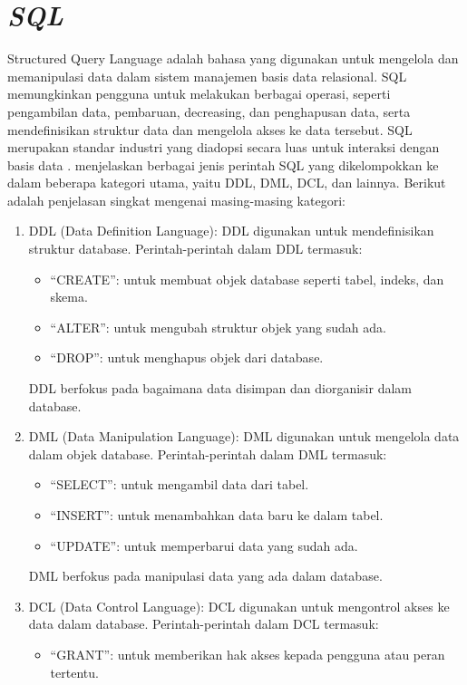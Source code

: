 \section{\textit{SQL}}
Structured Query Language adalah bahasa yang digunakan untuk mengelola dan memanipulasi data dalam sistem manajemen basis data relasional. SQL memungkinkan pengguna untuk melakukan berbagai operasi, seperti pengambilan data, pembaruan, decreasing, dan penghapusan data, serta mendefinisikan struktur data dan mengelola akses ke data tersebut. SQL merupakan standar industri yang diadopsi secara luas untuk interaksi dengan basis data \citep{santoso2021sql}.
\citet{santoso2021sql} menjelaskan berbagai jenis perintah SQL yang dikelompokkan ke dalam beberapa kategori utama, yaitu DDL, DML, DCL, dan lainnya. Berikut adalah penjelasan singkat mengenai masing-masing kategori:
\begin{enumerate}
  \item DDL (Data Definition Language): DDL digunakan untuk mendefinisikan struktur database. Perintah-perintah dalam DDL termasuk:
        \begin{itemize}
          \item ``CREATE'': untuk membuat objek database seperti tabel, indeks, dan skema.
          \item ``ALTER'': untuk mengubah struktur objek yang sudah ada.
          \item ``DROP'': untuk menghapus objek dari database.
        \end{itemize}
        DDL berfokus pada bagaimana data disimpan dan diorganisir dalam database.
  \item DML (Data Manipulation Language): DML digunakan untuk mengelola data dalam objek database. Perintah-perintah dalam DML termasuk:
        \begin{itemize}
          \item ``SELECT'': untuk mengambil data dari tabel.
          \item ``INSERT'': untuk menambahkan data baru ke dalam tabel.
          \item ``UPDATE'': untuk memperbarui data yang sudah ada.
        \end{itemize}
        DML berfokus pada manipulasi data yang ada dalam database.
  \item DCL (Data Control Language): DCL digunakan untuk mengontrol akses ke data dalam database. Perintah-perintah dalam DCL termasuk:
        \begin{itemize}
          \item ``GRANT'': untuk memberikan hak akses kepada pengguna atau peran tertentu.

\end{itemize}
\end{enumerate}
